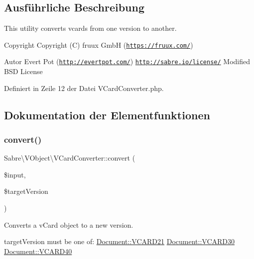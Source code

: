 \subsection{Ausführliche Beschreibung}
This utility converts vcards from one version to another.

\begin{DoxyCopyright}{Copyright}
Copyright (C) fruux GmbH (\href{https://fruux.com/}{\tt https\+://fruux.\+com/}) 
\end{DoxyCopyright}
\begin{DoxyAuthor}{Autor}
Evert Pot (\href{http://evertpot.com/}{\tt http\+://evertpot.\+com/})  \href{http://sabre.io/license/}{\tt http\+://sabre.\+io/license/} Modified B\+SD License 
\end{DoxyAuthor}


Definiert in Zeile 12 der Datei V\+Card\+Converter.\+php.



\subsection{Dokumentation der Elementfunktionen}
\mbox{\label{class_sabre_1_1_v_object_1_1_v_card_converter_ad46934ad06f5d8074c05191c42201325}} 
\subsubsection{\texorpdfstring{convert()}{convert()}}
{\footnotesize\ttfamily Sabre\textbackslash{}\+V\+Object\textbackslash{}\+V\+Card\+Converter\+::convert (\begin{DoxyParamCaption}\item[{\mbox{\hyperlink{class_sabre_1_1_v_object_1_1_component_1_1_v_card}{Component\textbackslash{}\+V\+Card}}}]{\$input,  }\item[{}]{\$target\+Version }\end{DoxyParamCaption})}

Converts a v\+Card object to a new version.

target\+Version must be one of\+: \mbox{\hyperlink{class_sabre_1_1_v_object_1_1_document_a9bf39e799fa7116f9b599085c76097c2}{Document\+::\+V\+C\+A\+R\+D21}} \mbox{\hyperlink{class_sabre_1_1_v_object_1_1_document_a5103d6dcd6e9040808f2b30c1ccad9c1}{Document\+::\+V\+C\+A\+R\+D30}} \mbox{\hyperlink{class_sabre_1_1_v_object_1_1_document_afa0952010d5ee8ba17096eba3ade6751}{Document\+::\+V\+C\+A\+R\+D40}}

